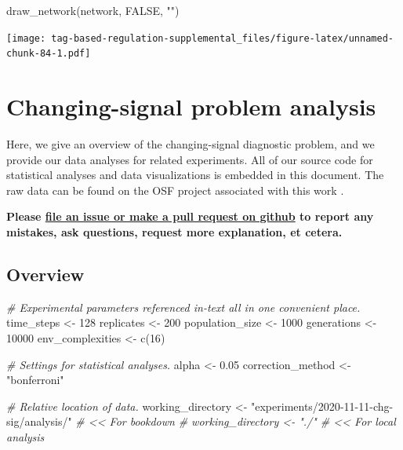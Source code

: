 \documentclass[
]{book}
\newenvironment{Shaded}{\begin{snugshade}}{\end{snugshade}}
\newcommand{\CommentTok}[1]{\textcolor[rgb]{0.56,0.35,0.01}{\textit{#1}}}
\newcommand{\ConstantTok}[1]{\textcolor[rgb]{0.00,0.00,0.00}{#1}}
\newcommand{\DecValTok}[1]{\textcolor[rgb]{0.00,0.00,0.81}{#1}}
\newcommand{\FloatTok}[1]{\textcolor[rgb]{0.00,0.00,0.81}{#1}}
\newcommand{\FunctionTok}[1]{\textcolor[rgb]{0.00,0.00,0.00}{#1}}
\newcommand{\NormalTok}[1]{#1}
\newcommand{\OtherTok}[1]{\textcolor[rgb]{0.56,0.35,0.01}{#1}}
\newcommand{\StringTok}[1]{\textcolor[rgb]{0.31,0.60,0.02}{#1}}
\begin{document}
\begin{Shaded}
\begin{Highlighting}[]
\FunctionTok{draw\_network}\NormalTok{(network, }\ConstantTok{FALSE}\NormalTok{, }\StringTok{""}\NormalTok{)}
\end{Highlighting}
\end{Shaded}

\texttt{[image: tag-based-regulation-supplemental\_files/figure-latex/unnamed-chunk-84-1.pdf]}

\hypertarget{changing-signal-problem-analysis}{%
\chapter{Changing-signal problem analysis}\label{changing-signal-problem-analysis}}

Here, we give an overview of the changing-signal diagnostic problem, and we provide our data analyses for related experiments.
All of our source code for statistical analyses and data visualizations is embedded in this document.
The raw data can be found on the OSF project associated with this work \citep{Lalejini_Moreno_Ofria_Data_2020}.

\textbf{Please \href{https://github.com/amlalejini/Tag-based-Genetic-Regulation-for-LinearGP/issues}{file an issue or make a pull request on github} to report any mistakes, ask questions, request more explanation, et cetera.}

\hypertarget{overview-3}{%
\section{Overview}\label{overview-3}}

\begin{Shaded}
\begin{Highlighting}[]
\CommentTok{\# Experimental parameters referenced in{-}text all in one convenient place.}
\NormalTok{time\_steps }\OtherTok{\textless{}{-}} \DecValTok{128}
\NormalTok{replicates }\OtherTok{\textless{}{-}} \DecValTok{200}
\NormalTok{population\_size }\OtherTok{\textless{}{-}} \DecValTok{1000}
\NormalTok{generations }\OtherTok{\textless{}{-}} \DecValTok{10000}
\NormalTok{env\_complexities }\OtherTok{\textless{}{-}} \FunctionTok{c}\NormalTok{(}\DecValTok{16}\NormalTok{)}

\CommentTok{\# Settings for statistical analyses.}
\NormalTok{alpha }\OtherTok{\textless{}{-}} \FloatTok{0.05}
\NormalTok{correction\_method }\OtherTok{\textless{}{-}} \StringTok{"bonferroni"}

\CommentTok{\# Relative location of data.}
\NormalTok{working\_directory }\OtherTok{\textless{}{-}} \StringTok{"experiments/2020{-}11{-}11{-}chg{-}sig/analysis/"} \CommentTok{\# \textless{}\textless{} For bookdown}
\CommentTok{\# working\_directory \textless{}{-} "./"                                     \# \textless{}\textless{} For local analysis}
\end{Highlighting}
\end{Shaded}
\end{document}
